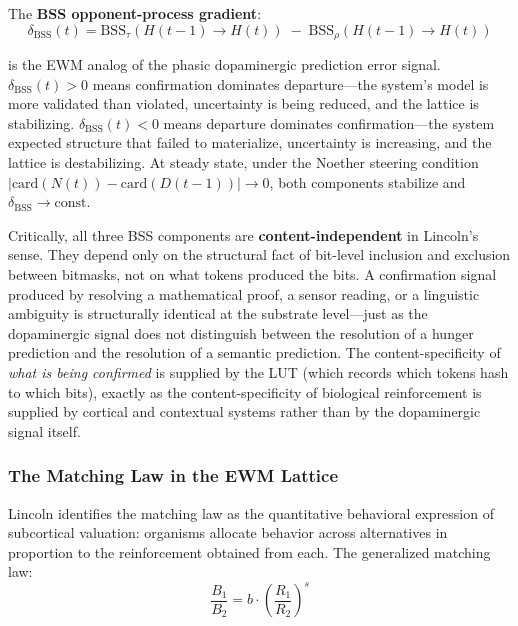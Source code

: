 \documentclass[11pt,a4paper]{article}
\theoremstyle{remark}
\begin{document}
The \textbf{BSS opponent-process gradient}:
\begin{equation}
  \delta_{\text{BSS}}(t) = \text{BSS}_{\tau}(H(t-1) \to H(t)) \;-\;
  \text{BSS}_{\rho}(H(t-1) \to H(t))
\end{equation}

is the EWM analog of the phasic dopaminergic prediction error signal.
$\delta_{\text{BSS}}(t) > 0$ means confirmation dominates departure---the
system's model is more validated than violated, uncertainty is being reduced,
and the lattice is stabilizing. $\delta_{\text{BSS}}(t) < 0$ means departure
dominates confirmation---the system expected structure that failed to
materialize, uncertainty is increasing, and the lattice is destabilizing. At
steady state, under the Noether steering condition $|\text{card}(N(t)) -
\text{card}(D(t-1))| \to 0$, both components stabilize and $\delta_{\text{BSS}}
\to \text{const}$.

Critically, all three BSS components are \textbf{content-independent} in
Lincoln's sense. They depend only on the structural fact of bit-level inclusion
and exclusion between bitmasks, not on what tokens produced the bits. A
confirmation signal produced by resolving a mathematical proof, a sensor
reading, or a linguistic ambiguity is structurally identical at the substrate
level---just as the dopaminergic signal does not distinguish between the
resolution of a hunger prediction and the resolution of a semantic prediction.
The content-specificity of \textit{what is being confirmed} is supplied by the
LUT (which records which tokens hash to which bits), exactly as the
content-specificity of biological reinforcement is supplied by cortical and
contextual systems rather than by the dopaminergic signal itself.

\subsubsection{The Matching Law in the EWM Lattice}

Lincoln identifies the matching law as the quantitative behavioral expression of
subcortical valuation: organisms allocate behavior across alternatives in
proportion to the reinforcement obtained from each. The generalized matching law:
\begin{equation}
  \frac{B_1}{B_2} = b \cdot \left(\frac{R_1}{R_2}\right)^s
\end{equation}
\end{document}
